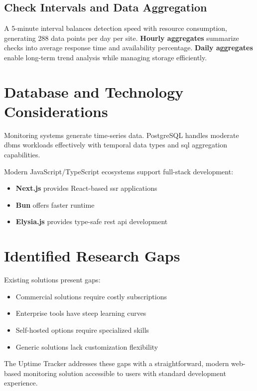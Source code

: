 \subsection{Check Intervals and Data Aggregation}

A 5-minute interval balances detection speed with resource consumption, generating 288 data points per day per site. \textbf{Hourly aggregates} summarize checks into average response time and availability percentage. \textbf{Daily aggregates} enable long-term trend analysis while managing storage efficiently.

\section{Database and Technology Considerations}

Monitoring systems generate time-series data. PostgreSQL handles moderate \gls{dbms} workloads effectively with temporal data types and \gls{sql} aggregation capabilities.

Modern JavaScript/TypeScript ecosystems support full-stack development:
\begin{itemize}
    \item \textbf{Next.js} provides React-based \gls{ssr} applications
    \item \textbf{Bun} offers faster runtime
    \item \textbf{Elysia.js} provides type-safe \gls{rest} \gls{api} development
\end{itemize}

\section{Identified Research Gaps}

Existing solutions present gaps:
\begin{itemize}
    \item Commercial solutions require costly subscriptions
    \item Enterprise tools have steep learning curves
    \item Self-hosted options require specialized skills
    \item Generic solutions lack customization flexibility
\end{itemize}
The Uptime Tracker addresses these gaps with a straightforward, modern web-based monitoring solution accessible to users with standard development experience.